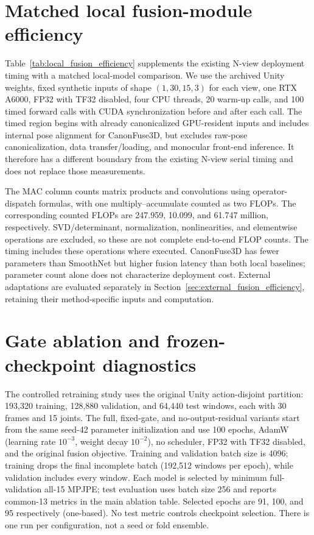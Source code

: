 \documentclass[11pt,letterpaper]{article}
\begin{document}
\section{Matched local fusion-module efficiency}
\label{sec:local_fusion_efficiency}

Table~\ref{tab:local_fusion_efficiency} supplements the existing N-view deployment timing with a matched local-model comparison. We use the archived Unity weights, fixed synthetic inputs of shape $(1,30,15,3)$ for each view, one RTX A6000, FP32 with TF32 disabled, four CPU threads, 20 warm-up calls, and 100 timed forward calls with CUDA synchronization before and after each call. The timed region begins with already canonicalized GPU-resident inputs and includes internal pose alignment for CanonFuse3D, but excludes raw-pose canonicalization, data transfer/loading, and monocular front-end inference. It therefore has a different boundary from the existing N-view serial timing and does not replace those measurements.

The MAC column counts matrix products and convolutions using operator-dispatch formulas, with one multiply--accumulate counted as two FLOPs. The corresponding counted FLOPs are 247.959, 10.099, and 61.747 million, respectively. SVD/determinant, normalization, nonlinearities, and elementwise operations are excluded, so these are not complete end-to-end FLOP counts. The timing includes these operations where executed. CanonFuse3D has fewer parameters than SmoothNet but higher fusion latency than both local baselines; parameter count alone does not characterize deployment cost. External adaptations are evaluated separately in Section~\ref{sec:external_fusion_efficiency}, retaining their method-specific inputs and computation.


\FloatBarrier
\section{Gate ablation and frozen-checkpoint diagnostics}
\label{sec:gate_audit}
The controlled retraining study uses the original Unity action-disjoint partition: 193,320 training, 128,880 validation, and 64,440 test windows, each with 30 frames and 15 joints. The full, fixed-gate, and no-output-residual variants start from the same seed-42 parameter initialization and use 100 epochs, AdamW (learning rate $10^{-3}$, weight decay $10^{-2}$), no scheduler, FP32 with TF32 disabled, and the original fusion objective. Training and validation batch size is 4096; training drops the final incomplete batch (192,512 windows per epoch), while validation includes every window. Each model is selected by minimum full-validation all-15 MPJPE; test evaluation uses batch size 256 and reports common-13 metrics in the main ablation table. Selected epochs are 91, 100, and 95 respectively (one-based). No test metric controls checkpoint selection. There is one run per configuration, not a seed or fold ensemble.
\end{document}
